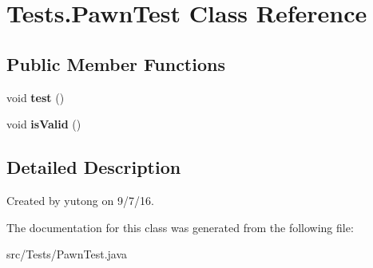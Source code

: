 \hypertarget{classTests_1_1PawnTest}{\section{Tests.\-Pawn\-Test Class Reference}
\label{classTests_1_1PawnTest}
}
\subsection*{Public Member Functions}
\begin{DoxyCompactItemize}
\item 
\hypertarget{classTests_1_1PawnTest_a545e4a8a8bbaa7fd6dc1f7248b7f9274}{void {\bfseries test} ()}\label{classTests_1_1PawnTest_a545e4a8a8bbaa7fd6dc1f7248b7f9274}

\item 
\hypertarget{classTests_1_1PawnTest_a58495055dc7b2cc8078a285cd76f50a4}{void {\bfseries is\-Valid} ()}\label{classTests_1_1PawnTest_a58495055dc7b2cc8078a285cd76f50a4}

\end{DoxyCompactItemize}


\subsection{Detailed Description}
Created by yutong on 9/7/16. 

The documentation for this class was generated from the following file\-:\begin{DoxyCompactItemize}
\item 
src/\-Tests/Pawn\-Test.\-java\end{DoxyCompactItemize}
